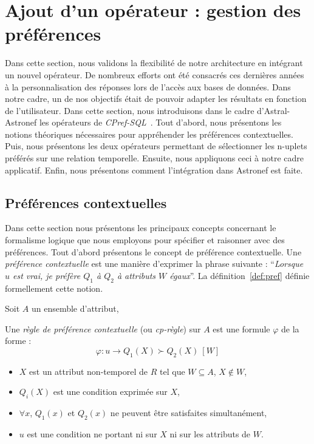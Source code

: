 \section{Ajout d'un opérateur : gestion des préférences} \label{sec:valid:domvision:architecture}
Dans cette section, nous validons la flexibilité de notre architecture en intégrant un nouvel opérateur. De nombreux efforts ont été consacrés ces dernières années à la personnalisation des réponses lors de l'accès aux bases de données. Dans notre cadre, un de nos objectifs était de pouvoir adapter les résultats en fonction de l'utilisateur. Dans cette section, nous introduisons dans le cadre d'Astral-Astronef les opérateurs de \textit{CPref-SQL}~\cite{DeAmo:cprefsql}. Tout d'abord, nous présentons les notions théoriques nécessaires pour appréhender les préférences contextuelles. Puis, nous présentons les deux opérateurs permettant de sélectionner les n-uplets préférés sur une relation temporelle. Ensuite, nous appliquons ceci à notre cadre applicatif. Enfin, nous présentons comment l'intégration dans Astronef est faite.

\subsection{Préférences contextuelles}
Dans cette section nous présentons les principaux concepts concernant le formalisme logique que nous employons pour spécifier et raisonner avec des préférences. Tout d'abord présentons le concept de préférence contextuelle. Une \textit{préférence contextuelle} est une manière d'exprimer la phrase suivante : \enquote{\it Lorsque $u$ est vrai, je préfère $Q_1$ à $Q_2$ à attributs $W$ égaux}. La définition~\ref{def:pref} définie formellement cette notion.

\begin{defi}\label{def:pref}
Soit $A$ un ensemble d'attribut,

Une \textit{règle de préférence contextuelle} (ou \textit{cp-règle}) sur $A$ est une formule $\varphi$ de la forme :
 $$\varphi: u \rightarrow Q_1(X) \succ Q_2(X)\ [W]$$
\begin{itemize}
	\item $X$ est un attribut non-temporel de $R$ tel que $W \subseteq A$, $X \not \in W$,
	\item $Q_i(X)$ est une condition exprimée sur $X$,
	\item $\forall x$, $Q_1(x)$ et $Q_2(x)$ ne peuvent être satisfaites simultanément,
	\item $u$ est une condition ne portant ni sur $X$ ni sur les attributs de $W$.
	\end{itemize}
\end{defi}

